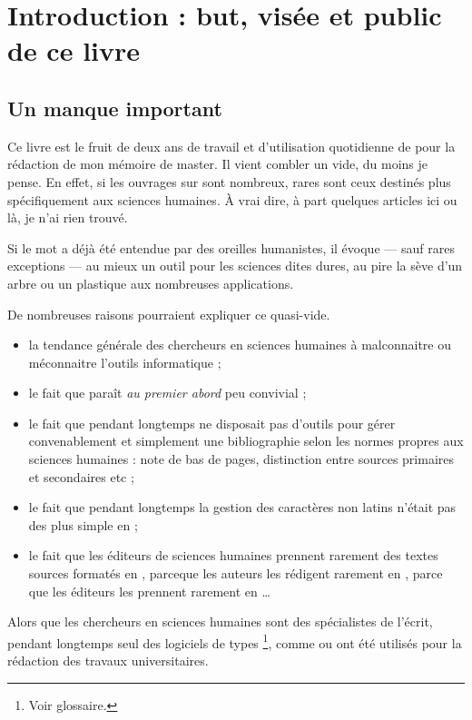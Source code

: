 \chapter{Introduction : but, visée et public de ce livre}
\section{Un manque important}

Ce livre est le fruit de deux ans de travail et d'utilisation quotidienne de \logiciel{\LaTeX} pour la rédaction de mon mémoire de master. Il vient combler un vide, du moins je pense. En effet, si les ouvrages sur \logiciel{\LaTeX} sont nombreux, rares sont ceux destinés plus spécifiquement aux sciences humaines. À vrai dire, à part quelques articles ici ou là, je n'ai rien trouvé.


Si le mot \logiciel{\LaTeX} a déjà été entendue par des oreilles humanistes, il évoque --- sauf rares exceptions --- au mieux un outil pour les sciences dites dures, au pire la sève d'un arbre ou un plastique aux nombreuses applications. 

De nombreuses raisons pourraient expliquer ce quasi-vide.
\begin{itemize}
\item la tendance générale des chercheurs en sciences humaines à malconnaitre ou méconnaitre l'outils informatique ;
\item le fait que \logiciel{\LaTeX} paraît \emph{au premier abord} peu convivial ;
\item le fait que pendant longtemps \logiciel{\LaTeX} ne disposait pas d'outils pour gérer convenablement et simplement une bibliographie selon les normes propres aux sciences humaines : note de bas de pages, distinction entre sources primaires et secondaires etc ;
\item le fait que pendant longtemps la gestion des caractères non latins n'était pas des plus simple en \logiciel{\LaTeX} ;
\item le fait que les éditeurs de sciences humaines prennent rarement des textes sources formatés en \logiciel{\LaTeX}, parceque les auteurs les rédigent rarement en \logiciel{\LaTeX}, parce que les éditeurs les prennent rarement en \logiciel{\LaTeX} \ldots
\end{itemize}

Alors que les chercheurs en sciences humaines sont des spécialistes de l'écrit, pendant longtemps seul des logiciels de types \footnote{Voir glossaire.}, comme  ou  ont été utilisés pour la rédaction des travaux universitaires.

